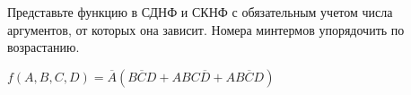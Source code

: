 \question Представьте функцию в СДНФ и СКНФ с обязательным учетом числа аргументов,
 от которых она зависит. Номера минтермов упорядочить по возрастанию.

 $f(A,B,C,D) = \overline{A}(B\overline{C}D+ABC\overline{D}+AB\overline{C}D)$